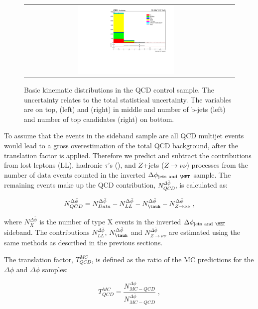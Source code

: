 \begin{figure}[hp]
\begin{center}
\begin{tabular}{cc}
\includegraphics[width=0.49\textwidth]{sections/mc4/Backgrounds/QCD/figures/84sb/_ntopjets_BasicCheck.pdf}
\end{tabular}
\end{center}
\caption{Basic kinematic distributions in the QCD control sample. The uncertainty relates to the total
statistical uncertainty. The variables are \MET on top, \MTTwo (left) and \HT (right) in middle
and number of b-jets (left) and number of top candidates (right) on bottom.}
\label{fig:BasicCheckQCD}
\end{figure}

To assume that the events in the sideband sample are all QCD multijet events 
would lead to a gross overestimation of the total QCD background, after the 
translation factor is applied. Therefore we predict and subtract the 
contributions from lost leptons (LL), hadronic $\tau$'s (\tauh), 
and $Z$+jets ($Z\rightarrow \nu\nu$) processes from the number of data 
events counted in the inverted $\Delta\phi_{\mathrm{jets~and}~\MET}$ sample.
The remaining events make up the QCD contribution, $N^{\Delta\bar{\phi}}_{QCD}$,
is calculated as:

\begin{equation}
N^{\Delta\bar{\phi}}_{QCD} = N^{\Delta\bar{\phi}}_{Data} - N^{\Delta\bar{\phi}}_{LL} - N^{\Delta\bar{\phi}}_{\tauh} - N^{\Delta\bar{\phi}}_{Z\rightarrow \nu\nu} \; ,
\label{eq:Nqcd}
\end{equation}

where $N^{\Delta\bar{\phi}}_{X}$ is the number of type X events in the 
inverted $\Delta\phi_{\mathrm{jets~and}~ \MET}$ sideband. The contributions 
$N^{\Delta\bar{\phi}}_{LL}$, $N^{\Delta\bar{\phi}}_{\tauh}$ and 
$N^{\Delta\bar{\phi}}_{Z \rightarrow \nu\nu}$ are estimated using the same 
methods as described in the previous sections. 

The translation factor, $T_{QCD}^{MC}$, is defined as the ratio of the MC
predictions for the $\Delta\phi$ and $\Delta\bar{\phi}$ samples: 

\begin{equation}
T_{QCD}^{MC} = \frac{N^{\Delta\phi}_{MC-QCD}}{N^{\Delta\bar{\phi}}_{MC-QCD}} \; ,
\label{eq:TqcdMC}
\end{equation}

